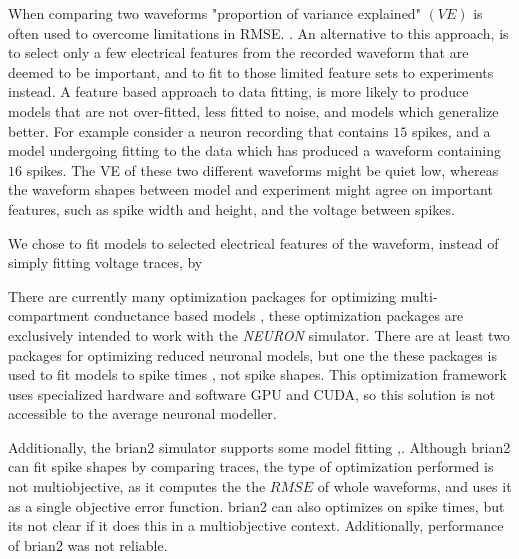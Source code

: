 When comparing two waveforms "proportion of variance explained" $(VE)$ is often used to overcome limitations in RMSE. \cite{schoppe2016measuring}. An alternative to this approach, is to select only a few electrical features from the recorded waveform that are deemed to be important, and to fit to those limited feature sets to experiments instead. A feature based approach to data fitting, is more likely to produce models that are not over-fitted, less fitted to noise, and models which generalize better. For example consider a neuron recording that contains $15$ spikes, and a model undergoing fitting to the data which has produced a waveform containing $16$ spikes. The VE of these two different waveforms might be quiet low, whereas the waveform shapes between model and experiment might agree on important features, such as spike width and height, and the voltage between spikes.


We chose to fit models to selected electrical features of the waveform, instead of simply fitting voltage traces, by 


There are currently many optimization packages for optimizing multi-compartment conductance based models \cite{friedrich2014flexible} \cite{bluepyopt} \cite{neurotune},  these optimization packages are exclusively intended to work with the \emph{NEURON} simulator. There are at least two packages for optimizing reduced neuronal models, but one the these packages is used to fit models to spike times \cite{rossant2010automatic}, not spike shapes. This optimization framework uses specialized hardware and software GPU and CUDA, so this solution is not accessible to the average neuronal modeller.

Additionally, the brian2 simulator supports some model fitting
\cite{brian2modelfitting},\cite{stimberg2019brian}. Although brian2 can fit spike shapes by comparing traces, the type of optimization performed is not multiobjective, as it computes the the $RMSE$ of whole waveforms, and uses it as a single objective error function. brian2 can also optimizes on spike times, but its not clear if it does this in a multiobjective context. Additionally, performance of brian2 was not reliable.

